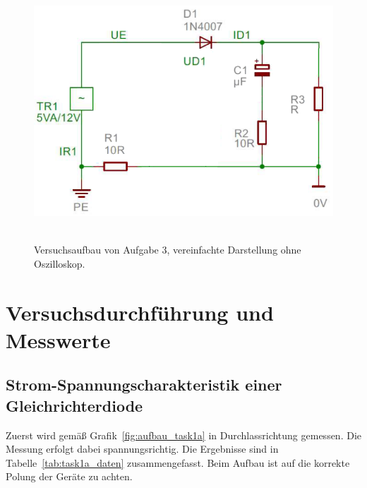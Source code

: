 \documentclass{article}
\begin{document}
\begin{figure}[H]
\caption{Versuchsaufbau von Aufgabe 3, vereinfachte Darstellung ohne Oszilloskop.}
\label{fig:aufbau_task3_simple}
{\centering
\includegraphics[scale=1.7]{bilder/aufbau_task3_vereinfacht.png}
~
}
\end{figure}



\section{Versuchsdurchführung und Messwerte}

\subsection{Strom-Spannungscharakteristik einer Gleichrichterdiode}

Zuerst wird gemäß Grafik~\ref{fig:aufbau_task1a} in Durchlassrichtung gemessen. Die Messung erfolgt dabei spannungsrichtig. Die Ergebnisse sind in Tabelle~\ref{tab:task1a_daten} zusammengefasst. Beim Aufbau ist auf die korrekte Polung der Geräte zu achten.
\end{document}
